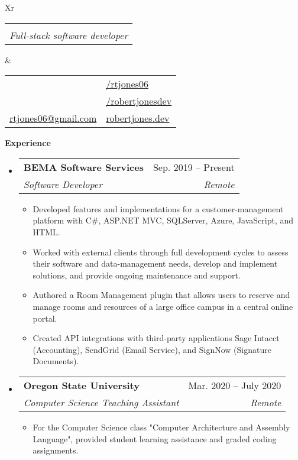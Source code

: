 \documentclass[letterpaper,12pt]{article}[leftmargin=*]
\makeatletter
\def \fullname {Robert Jones}
\def \subtitle {Full-stack software developer}
\def \locationicon {\faGlobe}
\def \locationtext {Salt Lake City, Utah}
\def \linkedinicon {\faLinkedin}
\def \linkedinlink {https://linkedin.com/in/rtjones06/}
\def \linkedintext {/rtjones06}
\def \phoneicon {\faPhone}
\def \phonetext {(713) 408-4485}
\def \emailicon {\faEnvelope}
\def \emaillink {mailto:rtjones06@gmail.com}
\def \emailtext {rtjones06@gmail.com}
\def \githubicon {\faGithub}
\def \githublink {https://github.com/robertjonesdev}
\def \githubtext {/robertjonesdev}
\def \websiteicon {\faGlobe}
\def \websitelink {https://robertjones.dev/}
\def \websitetext {robertjones.dev}
\def \headertype {\doublecol} %
\def \entryspacing {-0pt}
\def \linkedin {\linkedinicon \hspace{3pt}\href{\linkedinlink}{\linkedintext}}
\def \phone {\phoneicon \hspace{3pt}{ \phonetext}}
\def \location {\locationicon \hspace{3pt}{ \locationtext }}
\def \email {\emailicon \hspace{3pt}\href{\emaillink}{\emailtext}}
\def \github {\githubicon \hspace{3pt}\href{\githublink}{\githubtext}}
\def \website {\websiteicon \hspace{3pt}\href{\websitelink}{\websitetext}}
\renewcommand{\section}[2]{\vspace{5pt}
  \colorbox{secondary}{\color{white}\raggedbottom\normalsize\textbf{{#1}{\hspace{7pt}#2}}}
}
\newcommand{\resumeEntryStart}{\begin{itemize}[leftmargin=2.5mm]}
\newcommand{\resumeEntryEnd}{\end{itemize}\vspace{\entryspacing}}
\newcommand{\resumeItemListStart}{\begin{itemize}[leftmargin=4.5mm]}
\newcommand{\resumeItemListEnd}{\end{itemize}}
\newcommand{\resumeItem}[1]{
  \item\small{
    {#1 \vspace{-2pt}}
  }
}
\newcommand{\resumeEntryTSDL}[4]{
  \vspace{-1pt}\item[]
    \begin{tabularx}{0.97\textwidth}{X@{\hspace{60pt}}r}
      \textbf{\color{primary}#1} & {\firabook\color{accent}\small#2} \\
      \textit{\color{accent}\small#3} & \textit{\color{accent}\small#4} \\
    \end{tabularx}\vspace{-6pt}
}
\newcommand{\resumeEntryS}[2]{
  \item[]\small{
    \textbf{\color{primary}#1 }{ #2 \vspace{-6pt}}
  }
}
\newcommand{\doublecol}[6]{
  \begin{tabularx}{\textwidth}{Xr}
    {
      \begin{tabular}[c]{l}
        \fontsize{35}{45}\selectfont{\color{primary}{{\textbf{\fullname}}}} \\
        {\textit{\subtitle}} %
      \end{tabular}
    } & {
      \begin{tabular}[c]{l@{\hspace{1.5em}}l}
        {\small#4} & {\small#1} \\
        {\small#5} & {\small#2} \\
        {\small#6} & {\small#3}
      \end{tabular}
    }
  \end{tabularx}
}
\newcommand{\singlecol}[6]{
  \begin{tabularx}{\textwidth}{Xr}
    {
      \begin{tabular}[b]{l}
        \fontsize{35}{45}\selectfont{\color{primary}{{\textbf{\fullname}}}} \\
        {\textit{\subtitle}} %
      \end{tabular}
    } & {
      \begin{tabular}[c]{l}
        {\small#1} \\
        {\small#2} \\
        {\small#3} \\
        {\small#4} \\
        {\small#5} \\
        {\small#6}
      \end{tabular}
    }
  \end{tabularx}
}
\makeatother
\begin{document}


\headertype{\linkedin}{\github}{\website}{\location}{\phone}{\email}{} %
\vspace{0pt} %


\section{\faPieChart}{Experience}

  \resumeEntryStart
    \resumeEntryTSDL
      {BEMA Software Services}{Sep. 2019 -- Present}
      {Software Developer}{Remote}
    \resumeItemListStart
      \resumeItem {Developed features and implementations for a customer-management platform with C\#, ASP.NET MVC, SQLServer, Azure, JavaScript, and HTML. }
      \resumeItem {Worked with external clients through full development cycles to assess their software and data-management needs, develop and implement solutions, and provide ongoing maintenance and support.}
      \resumeItem {Authored a Room Management plugin that allows users to reserve and manage rooms and resources of a large office campus in a central online portal.}
      \resumeItem {Created API integrations with third-party applications Sage Intacct (Accounting), SendGrid (Email Service), and SignNow (Signature Documents).}
    \resumeItemListEnd
  \resumeEntryEnd

  \resumeEntryStart
    \resumeEntryTSDL
      {Oregon State University}{Mar. 2020 -- July 2020}
      {Computer Science Teaching Assistant}{Remote}
    \resumeItemListStart
      \resumeItem {For the Computer Science class "Computer Architecture and Assembly Language", provided student learning assistance and graded coding assignments.}
    \resumeItemListEnd
  \resumeEntryEnd
\end{document}
